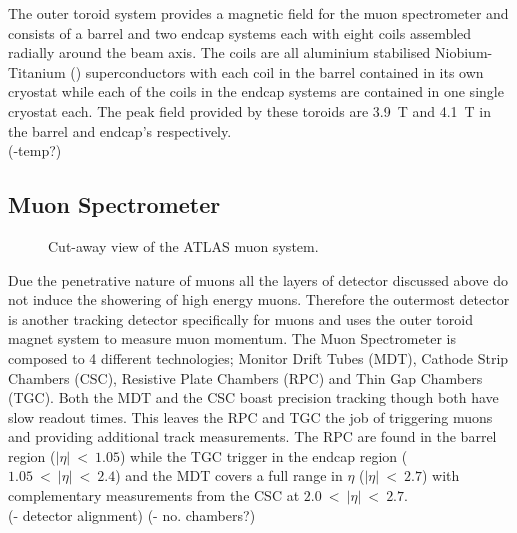 		The outer toroid system provides a magnetic field for the muon spectrometer and consists of a barrel and two endcap systems each with eight coils assembled radially around the beam axis. The coils are all aluminium stabilised Niobium-Titanium () superconductors with each coil in the barrel contained in its own cryostat while each of the coils in the endcap systems are contained in one single cryostat each. The peak field provided by these toroids are \SI{3.9}{T} and \SI{4.1}{T} in the barrel and endcap's respectively.\\
		(-temp?)

	


	\subsection{Muon Spectrometer}

		\begin{figure}[h]
			\begin{center}
			\end{center}
			\caption{ Cut-away view of the ATLAS muon system.}
			\label{fig:ATLAS_muon}
		\end{figure}

		Due the penetrative nature of muons all the layers of detector discussed above do not induce the showering of high energy muons. Therefore the outermost detector is another tracking detector specifically for muons and uses the outer toroid magnet system to measure muon momentum. The Muon Spectrometer is composed to 4 different technologies; Monitor Drift Tubes (MDT), Cathode Strip Chambers (CSC), Resistive Plate Chambers (RPC) and Thin Gap Chambers (TGC). Both the MDT and the CSC boast precision tracking though both have slow readout times. This leaves the RPC and TGC the job of triggering muons and providing additional track measurements. The RPC are found in the barrel region ($|\eta|~<~1.05$) while the TGC trigger in the endcap region ($1.05~<~|\eta|~<~2.4$) and the MDT covers a full range in $\eta$ ($|\eta|~<~2.7$) with complementary measurements from the CSC at $2.0~<~|\eta|~<~2.7$.\\
		(- detector alignment)
		(- no. chambers?)





